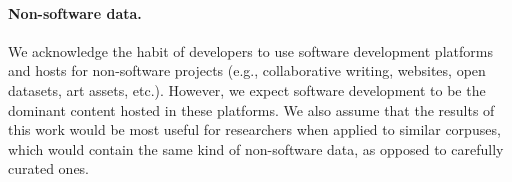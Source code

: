 \paragraph{Non-software data.}
We acknowledge the habit of developers to use software development platforms
and hosts for non-software projects (e.g., collaborative writing, websites,
open datasets, art assets, etc.). However, we expect software development to be
the dominant content hosted in these platforms. We also assume that the results
of this work would be most useful for researchers when applied to similar
corpuses, which would contain the same kind of non-software data, as opposed to
carefully curated ones.
